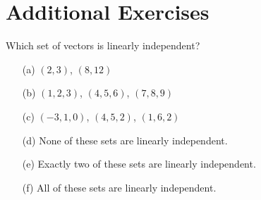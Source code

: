 \section{Additional Exercises}

\begin{problem}
    Which set of vectors is linearly independent?
    \begin{enumerate}
        \item[(a)] $(2,3)$, $(8,12)$
        \item[(b)] $(1,2,3)$, $(4,5,6)$, $(7,8,9)$
        \item[(c)] $(-3,1,0)$, $(4,5,2)$, $(1,6,2)$
        \item[(d)] None of these sets are linearly independent.
        \item[(e)] Exactly two of these sets are linearly independent.
        \item[(f)] All of these sets are linearly independent.
    \end{enumerate}
\end{problem}

